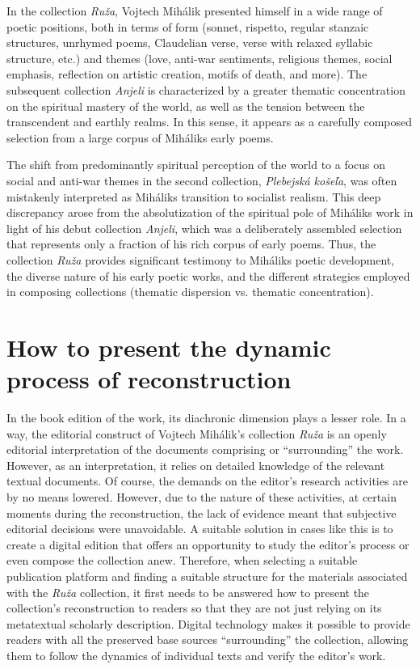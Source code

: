 \documentclass{article}
\begin{document}
In the collection \emph{Ruža}, Vojtech Mihálik presented himself in a
wide range of poetic positions, both in terms of form (sonnet, rispetto,
regular stanzaic structures, unrhymed poems, Claudelian verse, verse
with relaxed syllabic structure, etc.) and themes (love, anti-war
sentiments, religious themes, social emphasis, reflection on artistic
creation, motifs of death, and more). The subsequent collection
\emph{Anjeli} is characterized by a greater thematic concentration on
the spiritual mastery of the world, as well as the tension between the
transcendent and earthly realms. In this sense, it appears as a
carefully composed selection from a large corpus of
Mihálik\textquotesingle s early poems.

The shift from predominantly spiritual perception of the world to a
focus on social and anti-war themes in the second collection,
\emph{Plebejská košeľa}, was often mistakenly interpreted as
Mihálik\textquotesingle s transition to socialist realism. This deep
discrepancy arose from the absolutization of the spiritual pole of
Mihálik\textquotesingle s work in light of his debut collection
\emph{Anjeli}, which was a deliberately assembled selection that
represents only a fraction of his rich corpus of early poems. Thus, the
collection \emph{Ruža} provides significant testimony to
Mihálik\textquotesingle s poetic development, the diverse nature of his
early poetic works, and the different strategies employed in composing
collections (thematic dispersion vs. thematic concentration).

\section{How to present the dynamic process of
reconstruction}

In the book edition of the work, its diachronic dimension plays a lesser
role. In a way, the editorial construct of Vojtech Mihálik's collection
\emph{Ruža} is an openly editorial interpretation of the documents
comprising or ``surrounding'' the work. However, as an interpretation,
it relies on detailed knowledge of the relevant textual documents. Of
course, the demands on the editor's research activities are by no means
lowered. However, due to the nature of these activities, at certain
moments during the reconstruction, the lack of evidence meant that
subjective editorial decisions were unavoidable. A suitable solution in
cases like this is to create a digital edition that offers an
opportunity to study the editor's process or even compose the collection
anew. Therefore, when selecting a suitable publication platform and
finding a suitable structure for the materials associated with the
\emph{Ruža} collection, it first needs to be answered how to present the
collection's reconstruction to readers so that they are not just relying
on its metatextual scholarly description. Digital technology makes it
possible to provide readers with all the preserved base sources
``surrounding'' the collection, allowing them to follow the dynamics of
individual texts and verify the editor's work.
\end{document}
